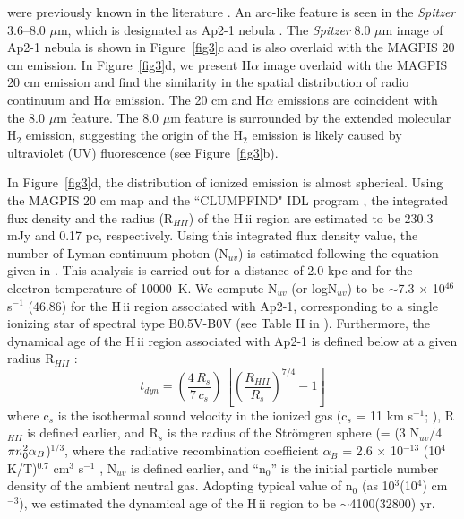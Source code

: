\documentclass[iop]{emulateapj}
\begin{document}
were previously known in the literature \citep[e.g.][]{froebrich11,sanchez14}.  An arc-like feature is seen in the {\it Spitzer} 3.6--8.0 $\mu$m, 
which is designated as Ap2-1 nebula \citep[e.g.][]{paron10}. The {\it Spitzer} 8.0 $\mu$m image of Ap2-1 nebula is shown in Figure~\ref{fig3}c and is also 
overlaid with the MAGPIS 20 cm emission. 
In Figure~\ref{fig3}d, we present H$\alpha$ image overlaid with the MAGPIS 20 cm emission and find the similarity in the spatial distribution of radio continuum and H$\alpha$ emission. The 20 cm and H$\alpha$ emissions are coincident with the 8.0 $\mu$m feature. 
The 8.0 $\mu$m feature is surrounded by the extended molecular H$_{2}$ emission,  suggesting 
the origin of the H$_{2}$ emission is likely caused by ultraviolet (UV) fluorescence (see Figure~\ref{fig3}b).

In Figure~\ref{fig3}d, the distribution of ionized emission is almost spherical. 
Using the MAGPIS 20 cm map and the ``CLUMPFIND" IDL program \citep{williams94}, the integrated flux 
density and the radius (R$_{HII}$) of the H\,{\sc ii} region are estimated to be 230.3 mJy and 0.17 pc, respectively. 
Using this integrated flux density value, the number of Lyman continuum photon (N$_{uv}$) is estimated 
following the equation given in \citet{matsakis76} \citep[see][for more details]{dewangan16}. 
This analysis is carried out for a distance of 2.0 kpc and for the electron temperature of 10000~K. 
We compute N$_{uv}$ (or logN$_{uv}$) to be $\sim$7.3 $\times$ 10$^{46}$ s$^{-1}$ (46.86) for the H\,{\sc ii} region associated with Ap2-1, 
corresponding to a single ionizing star of spectral type B0.5V-B0V (see Table II in \citet{panagia73}). 
Furthermore, the dynamical age of the H\,{\sc ii} region associated with Ap2-1 is defined below at a given radius R$_{HII}$ \citep[e.g.,][]{dyson80}:
\begin{equation}
t_{dyn} = \left(\frac{4\,R_{s}}{7\,c_{s}}\right) \,\left[\left(\frac{R_{HII}}{R_{s}}\right)^{7/4}- 1\right] 
\end{equation}
where c$_{s}$ is the isothermal sound velocity in the ionized gas (c$_{s}$ = 11 km s$^{-1}$; \citet{bisbas09}), 
R$_{HII}$ is defined earlier, and R$_{s}$ is the radius of the Str\"{o}mgren sphere (= (3 N$_{uv}$/4$\pi n^2_{\rm{0}} \alpha_{B}$)$^{1/3}$, where 
the radiative recombination coefficient $\alpha_{B}$ =  2.6 $\times$ 10$^{-13}$ (10$^{4}$ K/T)$^{0.7}$ cm$^{3}$ s$^{-1}$ \citep{kwan97}, 
N$_{uv}$ is defined earlier, and ``n$_{0}$'' is the initial particle number density of the ambient neutral gas. 
Adopting typical value of n$_{0}$ (as 10$^{3}$(10$^{4}$) cm$^{-3}$), we estimated the dynamical age of the H\,{\sc ii} region 
to be $\sim$4100(32800) yr.
  
\end{document}

